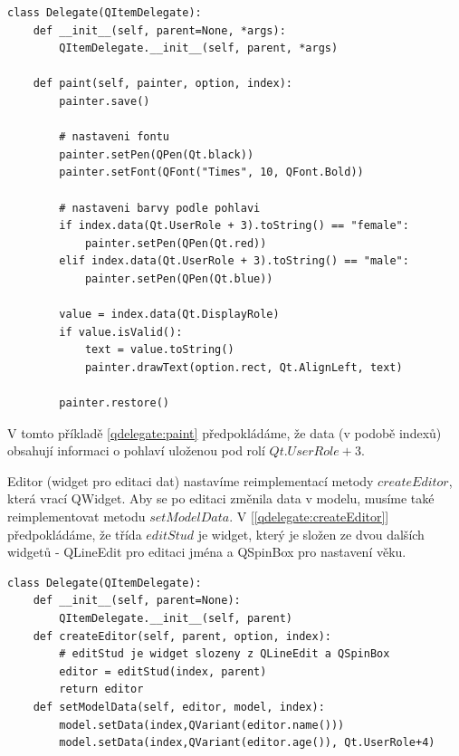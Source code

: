 \newpage
\begin{lstlisting}[label=qdelegate:paint,caption={Delegate - přepsání metody $paint$}, morekeywords={QItemDelegate, Qt, QFont, AlignLeft, DisplayRole, UserRole, QPen}]
class Delegate(QItemDelegate):
    def __init__(self, parent=None, *args):
        QItemDelegate.__init__(self, parent, *args)

    def paint(self, painter, option, index):
        painter.save()       
        
        # nastaveni fontu
        painter.setPen(QPen(Qt.black))
        painter.setFont(QFont("Times", 10, QFont.Bold))
        
		# nastaveni barvy podle pohlavi
        if index.data(Qt.UserRole + 3).toString() == "female":
            painter.setPen(QPen(Qt.red))
        elif index.data(Qt.UserRole + 3).toString() == "male":
            painter.setPen(QPen(Qt.blue))

        value = index.data(Qt.DisplayRole)
        if value.isValid():
            text = value.toString()
            painter.drawText(option.rect, Qt.AlignLeft, text)
            
        painter.restore()
\end{lstlisting}

        
\noindent V tomto příkladě \ref{qdelegate:paint} předpokládáme, že data (v podobě indexů) obsahují informaci o pohlaví uloženou pod rolí $Qt.UserRole + 3$.

Editor (widget pro editaci dat) nastavíme reimplementací metody $createEditor$, která vrací QWidget. Aby se po editaci změnila data v modelu, musíme také reimplementovat metodu $setModelData$. V [\lstlistingname \ref{qdelegate:createEditor}] předpokládáme, že třída $editStud$ je widget, který je složen ze dvou dalších widgetů - QLineEdit pro editaci jména a QSpinBox pro nastavení věku. \\
\newpage
\begin{lstlisting}[label=qdelegate:createEditor,caption={Delegate - přepsání metod $createEditor$ a $setModelData$}, morekeywords={QItemDelegate, Qt, QFont, AlignLeft, DisplayRole, UserRole, QPen}]
class Delegate(QItemDelegate):
    def __init__(self, parent=None):
        QItemDelegate.__init__(self, parent)
    def createEditor(self, parent, option, index):
    	# editStud je widget slozeny z QLineEdit a QSpinBox
        editor = editStud(index, parent)
        return editor    
    def setModelData(self, editor, model, index):
        model.setData(index,QVariant(editor.name()))
        model.setData(index,QVariant(editor.age()), Qt.UserRole+4)
\end{lstlisting}

